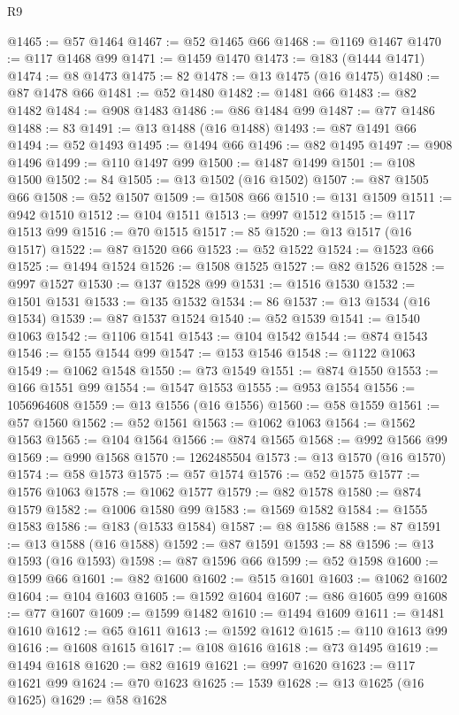 \begin{lexlean}{R9}
\begin{coremodule}
@1465 := @57 @1464
@1467 := @52 @1465 @66
@1468 := @1169 @1467
@1470 := @117 @1468 @99
@1471 := @1459 @1470
@1473 := @183 (@1444 @1471)
@1474 := @8 @1473
@1475 := 82
@1478 := @13 @1475 (@16 @1475)
@1480 := @87 @1478 @66
@1481 := @52 @1480
@1482 := @1481 @66
@1483 := @82 @1482
@1484 := @908 @1483
@1486 := @86 @1484 @99
@1487 := @77 @1486
@1488 := 83
@1491 := @13 @1488 (@16 @1488)
@1493 := @87 @1491 @66
@1494 := @52 @1493
@1495 := @1494 @66
@1496 := @82 @1495
@1497 := @908 @1496
@1499 := @110 @1497 @99
@1500 := @1487 @1499
@1501 := @108 @1500
@1502 := 84
@1505 := @13 @1502 (@16 @1502)
@1507 := @87 @1505 @66
@1508 := @52 @1507
@1509 := @1508 @66
@1510 := @131 @1509
@1511 := @942 @1510
@1512 := @104 @1511
@1513 := @997 @1512
@1515 := @117 @1513 @99
@1516 := @70 @1515
@1517 := 85
@1520 := @13 @1517 (@16 @1517)
@1522 := @87 @1520 @66
@1523 := @52 @1522
@1524 := @1523 @66
@1525 := @1494 @1524
@1526 := @1508 @1525
@1527 := @82 @1526
@1528 := @997 @1527
@1530 := @137 @1528 @99
@1531 := @1516 @1530
@1532 := @1501 @1531
@1533 := @135 @1532
@1534 := 86
@1537 := @13 @1534 (@16 @1534)
@1539 := @87 @1537 @1524
@1540 := @52 @1539
@1541 := @1540 @1063
@1542 := @1106 @1541
@1543 := @104 @1542
@1544 := @874 @1543
@1546 := @155 @1544 @99
@1547 := @153 @1546
@1548 := @1122 @1063
@1549 := @1062 @1548
@1550 := @73 @1549
@1551 := @874 @1550
@1553 := @166 @1551 @99
@1554 := @1547 @1553
@1555 := @953 @1554
@1556 := 1056964608
@1559 := @13 @1556 (@16 @1556)
@1560 := @58 @1559
@1561 := @57 @1560
@1562 := @52 @1561
@1563 := @1062 @1063
@1564 := @1562 @1563
@1565 := @104 @1564
@1566 := @874 @1565
@1568 := @992 @1566 @99
@1569 := @990 @1568
@1570 := 1262485504
@1573 := @13 @1570 (@16 @1570)
@1574 := @58 @1573
@1575 := @57 @1574
@1576 := @52 @1575
@1577 := @1576 @1063
@1578 := @1062 @1577
@1579 := @82 @1578
@1580 := @874 @1579
@1582 := @1006 @1580 @99
@1583 := @1569 @1582
@1584 := @1555 @1583
@1586 := @183 (@1533 @1584)
@1587 := @8 @1586
@1588 := 87
@1591 := @13 @1588 (@16 @1588)
@1592 := @87 @1591
@1593 := 88
@1596 := @13 @1593 (@16 @1593)
@1598 := @87 @1596 @66
@1599 := @52 @1598
@1600 := @1599 @66
@1601 := @82 @1600
@1602 := @515 @1601
@1603 := @1062 @1602
@1604 := @104 @1603
@1605 := @1592 @1604
@1607 := @86 @1605 @99
@1608 := @77 @1607
@1609 := @1599 @1482
@1610 := @1494 @1609
@1611 := @1481 @1610
@1612 := @65 @1611
@1613 := @1592 @1612
@1615 := @110 @1613 @99
@1616 := @1608 @1615
@1617 := @108 @1616
@1618 := @73 @1495
@1619 := @1494 @1618
@1620 := @82 @1619
@1621 := @997 @1620
@1623 := @117 @1621 @99
@1624 := @70 @1623
@1625 := 1539
@1628 := @13 @1625 (@16 @1625)
@1629 := @58 @1628

\end{coremodule}
\end{lexlean}
